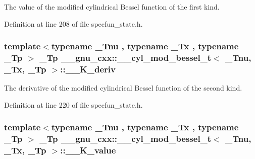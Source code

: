 The value of the modified cylindrical Bessel function of the first kind. 



Definition at line 208 of file specfun\+\_\+state.\+h.

\subsubsection[{\texorpdfstring{\+\_\+\+\_\+\+K\+\_\+deriv}{__K_deriv}}]{\setlength{\rightskip}{0pt plus 5cm}template$<$typename \+\_\+\+Tnu , typename \+\_\+\+Tx , typename \+\_\+\+Tp $>$ \+\_\+\+Tp {\bf \+\_\+\+\_\+gnu\+\_\+cxx\+::\+\_\+\+\_\+cyl\+\_\+mod\+\_\+bessel\+\_\+t}$<$ \+\_\+\+Tnu, \+\_\+\+Tx, \+\_\+\+Tp $>$\+::\+\_\+\+\_\+\+K\+\_\+deriv}\hypertarget{struct____gnu__cxx_1_1____cyl__mod__bessel__t_a8f86a11fb265db76743d80e98be389be}{}\label{struct____gnu__cxx_1_1____cyl__mod__bessel__t_a8f86a11fb265db76743d80e98be389be}


The derivative of the modified cylindrical Bessel function of the second kind. 



Definition at line 220 of file specfun\+\_\+state.\+h.

\subsubsection[{\texorpdfstring{\+\_\+\+\_\+\+K\+\_\+value}{__K_value}}]{\setlength{\rightskip}{0pt plus 5cm}template$<$typename \+\_\+\+Tnu , typename \+\_\+\+Tx , typename \+\_\+\+Tp $>$ \+\_\+\+Tp {\bf \+\_\+\+\_\+gnu\+\_\+cxx\+::\+\_\+\+\_\+cyl\+\_\+mod\+\_\+bessel\+\_\+t}$<$ \+\_\+\+Tnu, \+\_\+\+Tx, \+\_\+\+Tp $>$\+::\+\_\+\+\_\+\+K\+\_\+value}\hypertarget{struct____gnu__cxx_1_1____cyl__mod__bessel__t_a481e4c4537583c461654405c01c25566}{}\label{struct____gnu__cxx_1_1____cyl__mod__bessel__t_a481e4c4537583c461654405c01c25566}


